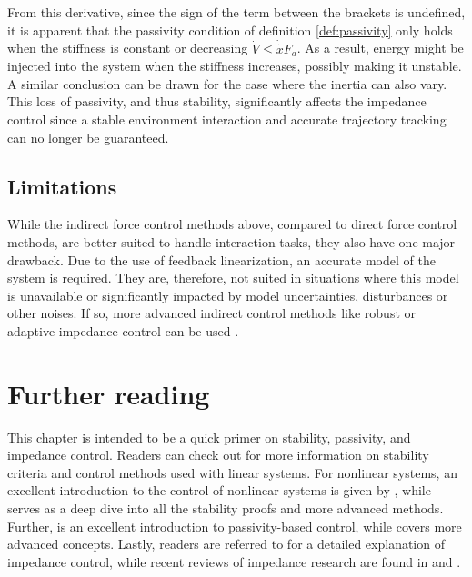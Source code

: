 From this derivative, since the sign of the term between the brackets is undefined, it is apparent that the passivity condition of definition \ref{def:passivity} only holds when the stiffness is constant or decreasing $\dot{V} \le \dot{\widetilde{x}} F_a$. As a result, energy might be injected into the system when the stiffness increases, possibly making it unstable. A similar conclusion can be drawn for the case where the inertia can also vary. This loss of passivity, and thus stability, significantly affects the impedance control since a stable environment interaction and accurate trajectory tracking can no longer be guaranteed.

\subsection{Limitations}

While the indirect force control methods above, compared to direct force control methods, are better suited to handle interaction tasks, they also have one major drawback. Due to the use of feedback linearization, an accurate model of the system is required. They are, therefore, not suited in situations where this model is unavailable or significantly impacted by model uncertainties, disturbances or other noises. If so, more advanced indirect control methods like robust or adaptive impedance control can be used \cite{songTutorialSurveyComparison2019,khalilNonlinearControl2015,villaniForceControl2016}.

\section{Further reading}

This chapter is intended to be a quick primer on stability, passivity, and impedance control. Readers can check out \cite{bacciottiStabilityControlLinear2019} for more information on stability criteria and control methods used with linear systems. For nonlinear systems, an excellent introduction to the control of nonlinear systems is given by \cite{khalilNonlinearControl2015}, while \cite{khalilNonlinearSystems2002} serves as a deep dive into all the stability proofs and more advanced methods. Further, \cite{baoProcessControlPassive2007} is an excellent introduction to passivity-based control, while \cite{haddadNonlinearDynamicalSystems2011} covers more advanced concepts. Lastly, readers are referred to \cite{sicilianoRoboticsModellingPlanning2010} for a detailed explanation of impedance control, while recent reviews of impedance research are found in \cite{songTutorialSurveyComparison2019} and \cite{al-shukaActiveImpedanceControl2018}.
